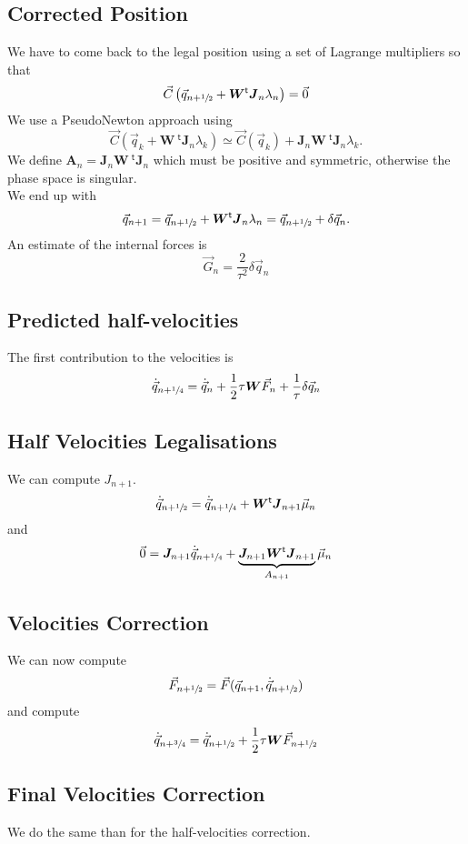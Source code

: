 \documentclass[aps,twocolumn]{revtex4}
\newcommand{\mymat}[1]{\boldsymbol{#1}}
\newcommand{\mytrn}[1]{{\!\!~^{\mathsf{t}}{#1}}}
\newcommand{\half}{\sfrac{1}{2}}
\newcommand{\q}{\vec{q}}
\newcommand{\dq}{\dot{\q}}
\newcommand{\C}{\vec{C}}
\newcommand{\J}{\mymat{J}}
\newcommand{\tJ}{\mytrn{\J}}
\newcommand{\W}{\mymat{W}}
\newcommand{\A}{\mymat{A}}
\begin{document}
\subsection{Corrected Position}
We have to come back to the legal position using a set of Lagrange multipliers so that
\begin{equation}
	\C\left( \q_{n+\half} + \W\tJ_n \lambda_n \right) = \vec{0}
\end{equation}
We use a PseudoNewton approach using
$$
	\C\left( \q_k + \W\tJ_n \lambda_k \right) \simeq \C\left( \q_k \right) + \J_n\W\tJ_n \lambda_k.
$$
We define $\A_n = \J_n\W\tJ_n$ which must be positive and symmetric, otherwise the phase space is singular.\\

We end up with
\begin{equation}
	\q_{n+1} = \q_{n+\half} + \W\tJ_n \lambda_n = \q_{n+\half} + \delta\q_n.
\end{equation}
An estimate of the internal forces is
$$
	\vec{G}_n = \dfrac{2}{\tau^2} \delta\q_n
$$

\subsection{Predicted half-velocities}
The first contribution to the velocities is
\begin{equation}
	\dq_{n+\sfrac{1}{4}} = \dq_n + \frac{1}{2}\tau\W \vec{F}_n+ \dfrac{1}{\tau}\delta\q_n
\end{equation}

\subsection{Half Velocities Legalisations}
We can compute $J_{n+1}$.
\begin{equation}
	\dq_{n+\half} = \dq_{n+\sfrac{1}{4}} + \W\tJ_{n+1} \vec{\mu}_n
\end{equation}
and
\begin{equation}
	\vec{0} = \J_{n+1}\dq_{n+\sfrac{1}{4}} + \underbrace{\J_{n+1}\W\tJ_{n+1}}_{A_{n+1}} \vec{\mu}_n
\end{equation}

\subsection{Velocities Correction}
We can now compute
\begin{equation}
	\vec{F}_{n+\half} = \vec{F}(\q_{n+1},\dq_{n+\half})
\end{equation}
and compute
\begin{equation}
	\dq_{n+\sfrac{3}{4}} = \dq_{n+\half} + \dfrac{1}{2}\tau \W\vec{F}_{n+\half}
\end{equation}
\subsection{Final Velocities Correction}
We do the same than for the half-velocities correction.
\end{document}
